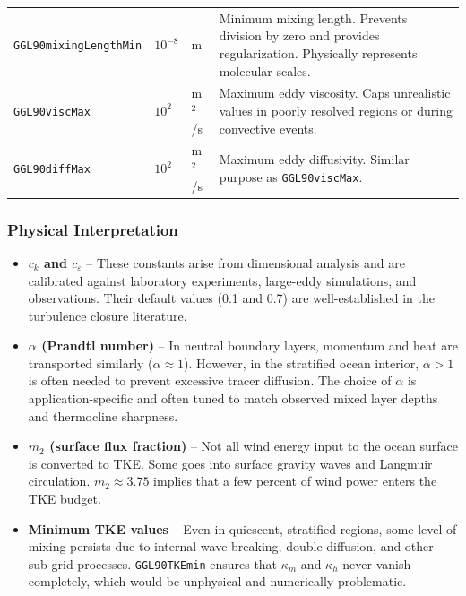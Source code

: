 \documentclass[12pt,letterpaper]{article}
\newcommand{\KM}{\kappa_m}
\newcommand{\KH}{\kappa_h}
\begin{document}
\begin{table}[h!]
\begin{tabular}{@{}lllp{6cm}@{}}
\texttt{GGL90mixingLengthMin} & $10^{-8}$ & m & Minimum mixing length. Prevents
                                               division by zero and provides
                                               regularization. Physically
                                               represents molecular scales. \\[6pt]

\texttt{GGL90viscMax} & $10^{2}$ & m$^2$/s & Maximum eddy viscosity. Caps
                                             unrealistic values in poorly
                                             resolved regions or during
                                             convective events. \\[6pt]

\texttt{GGL90diffMax} & $10^{2}$ & m$^2$/s & Maximum eddy diffusivity. Similar
                                             purpose as \texttt{GGL90viscMax}. \\

\bottomrule
\end{tabular}
\end{table}

\subsubsection{Physical Interpretation}

\begin{itemize}[leftmargin=*]
  \item \textbf{$c_k$ and $c_\varepsilon$} -- These constants arise from
        dimensional analysis and are calibrated against laboratory experiments,
        large-eddy simulations, and observations. Their default values (0.1 and
        0.7) are well-established in the turbulence closure literature.

  \item \textbf{$\alpha$ (Prandtl number)} -- In neutral boundary layers,
        momentum and heat are transported similarly ($\alpha \approx 1$).
        However, in the stratified ocean interior, $\alpha > 1$ is often
        needed to prevent excessive tracer diffusion. The choice of $\alpha$
        is application-specific and often tuned to match observed mixed layer
        depths and thermocline sharpness.

  \item \textbf{$m_2$ (surface flux fraction)} -- Not all wind energy input
        to the ocean surface is converted to TKE. Some goes into surface
        gravity waves and Langmuir circulation. $m_2 \approx 3.75$ implies
        that a few percent of wind power enters the TKE budget.

  \item \textbf{Minimum TKE values} -- Even in quiescent, stratified regions,
        some level of mixing persists due to internal wave breaking, double
        diffusion, and other sub-grid processes. \texttt{GGL90TKEmin} ensures
        that $\KM$ and $\KH$ never vanish completely, which would be unphysical
        and numerically problematic.
\end{itemize}
\end{document}

